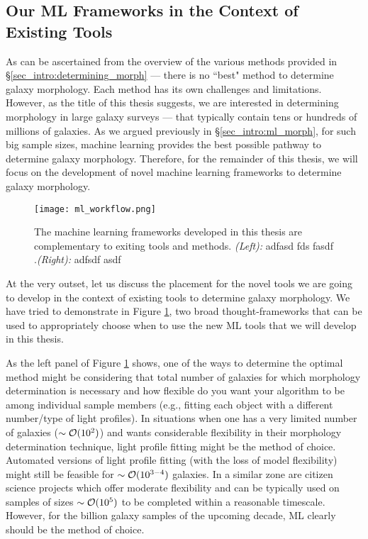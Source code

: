 \subsection{Our ML Frameworks in the Context of Existing Tools} \label{sec_intro:ml_complementary}
As can be ascertained from the overview of the various methods provided in \S \ref{sec_intro:determining_morph} --- there is no ``best" method to determine galaxy morphology. Each method has its own challenges and limitations. However, as the title of this thesis suggests, we are interested in determining morphology in large galaxy surveys --- that typically contain tens or hundreds of millions of galaxies. As we argued previously in \S \ref{sec_intro:ml_morph}, for such big sample sizes, machine learning provides the best possible pathway to determine galaxy morphology. Therefore, for the remainder of this thesis, we will focus on the development of novel machine learning frameworks to determine galaxy morphology. 

\begin{figure}[htbp]
    \centering
    \texttt{[image: ml\_workflow.png]}
    \caption{The machine learning frameworks developed in this thesis are complementary to exiting tools and methods. \textit{(Left):} adfasd fds fasdf .\textit{(Right):} adfsdf asdf }
    \label{fig_intro:ml_workflow}
\end{figure}

At the very outset, let us discuss the placement for the novel tools we are going to develop in the context of existing tools to determine galaxy morphology. We have tried to demonstrate in Figure \ref{fig_intro:ml_workflow}, two broad thought-frameworks that can be used to appropriately choose when to use the new ML tools that we will develop in this thesis.

As the left panel of Figure \ref{fig_intro:ml_workflow} shows, one of the ways to determine the optimal method might be considering that total number of galaxies for which morphology determination is necessary and how flexible do you want your algorithm to be among individual sample members (e.g., fitting each object with a different number/type of light profiles). In situations when one has a very limited number of galaxies ($\sim \mathcal{O}(10^{2})$) and wants considerable flexibility in their morphology determination technique, light profile fitting might be the method of choice. Automated versions of light profile fitting (with the loss of model flexibility) might still be feasible for $\sim \mathcal{O}(10^{3-4})$ galaxies. In a similar zone are citizen science projects which offer moderate flexibility and can be typically used on samples of sizes $\sim \mathcal{O}(10^{5})$ to be completed within a reasonable timescale. However, for the billion galaxy samples of the upcoming decade, ML clearly should be the method of choice. 

